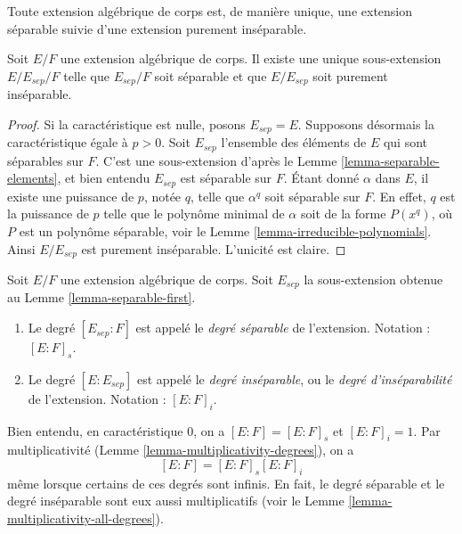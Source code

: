 \begin{lemma}
\label{lemma-separable-first}
\begin{slogan}
Toute extension algébrique de corps est, de manière unique, une extension
séparable suivie d'une extension purement inséparable.
\end{slogan}
Soit $E/F$ une extension algébrique de corps. Il existe une unique sous-extension
$E/E_{sep}/F$ telle que $E_{sep}/F$ soit séparable et que $E/E_{sep}$ soit
purement inséparable.
\end{lemma}

\begin{proof}
Si la caractéristique est nulle, posons $E_{sep} = E$. Supposons désormais la caractéristique
égale à $p > 0$. Soit $E_{sep}$ l'ensemble des éléments de $E$ qui sont séparables
sur $F$. C'est une sous-extension d'après le Lemme \ref{lemma-separable-elements},
et bien entendu $E_{sep}$ est séparable sur $F$. Étant donné $\alpha$ dans $E$,
il existe une puissance de $p$, notée $q$, telle que $\alpha^q$ soit séparable sur $F$.
En effet, $q$ est la puissance de $p$ telle que le polynôme minimal de
$\alpha$ soit de la forme $P(x^q)$, où $P$ est un polynôme séparable, voir le
Lemme \ref{lemma-irreducible-polynomials}. Ainsi $E/E_{sep}$ est purement
inséparable. L'unicité est claire.
\end{proof}

\begin{definition}
\label{definition-insep-degree}
Soit $E/F$ une extension algébrique de corps. Soit $E_{sep}$ la sous-extension
obtenue au Lemme \ref{lemma-separable-first}.
\begin{enumerate}
\item Le degré $[E_{sep} : F]$ est appelé le {\it degré séparable}
de l'extension. Notation : $[E : F]_s$.
\item Le degré $[E : E_{sep}]$ est appelé le {\it degré inséparable},
ou le {\it degré d'inséparabilité} de l'extension.
Notation : $[E : F]_i$.
\end{enumerate}
\end{definition}

\noindent
Bien entendu, en caractéristique $0$, on a $[E : F] = [E : F]_s$ et
$[E : F]_i = 1$. Par multiplicativité
(Lemme \ref{lemma-multiplicativity-degrees}), on a
$$
[E : F] = [E : F]_s [E : F]_i
$$
même lorsque certains de ces degrés sont infinis. En fait, le degré séparable
et le degré inséparable sont eux aussi multiplicatifs (voir le
Lemme \ref{lemma-multiplicativity-all-degrees}).


